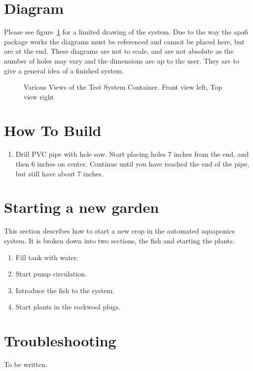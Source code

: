 \documentclass[american,man,12pt]{article}
\begin{document}
\section{Diagram}
Please see figure~\ref{fig:views} for a limited drawing of the system.
Due to the way the apa6 package works the
diagrams must be referenced and cannot be placed here, but are at the end. These
diagrams are not to scale, and are not absolute as the number of holes may vary
and the dimensions are up to the user. They are to give a general idea of a
finished system.

\begin{figure}[h]
    \centering
    \caption{Various Views of the Test System Container. Front view left, Top
    view right}
    \label{fig:views}
\end{figure}



\section{How To Build}
\begin{enumerate}
	\item Drill PVC pipe with hole saw. Start placing holes 7 inches from the
		  end, and then 6 inches on center. Continue until you have reached
		  the end of the pipe, but still have about 7 inches.
\end{enumerate}


\section{Starting a new garden}
This section describes how to start a new crop in the automated aquaponics
system. It is broken down into two sections, the fish and starting the plants.

\begin{enumerate}
	\item Fill tank with water.
	\item Start pump circulation.
	\item Introduce the fish to the system.
	\item Start plants in the rockwool plugs.
\end{enumerate}



\section{Troubleshooting}
To be written.


\printbibliography
\end{document}
